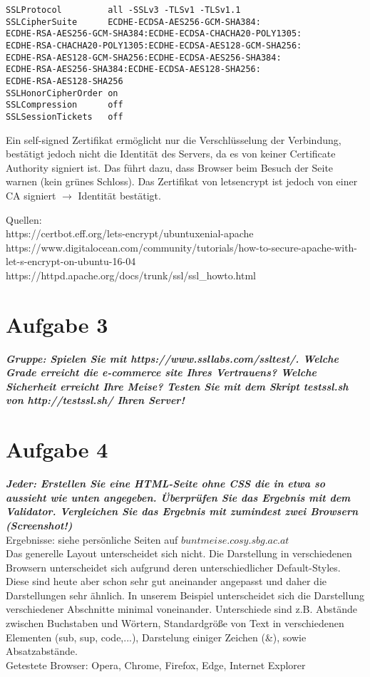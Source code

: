 \documentclass[12pt, a4paper]{report}
\begin{document}
\begin{enumerate}
	\begin{verbatim}
SSLProtocol         all -SSLv3 -TLSv1 -TLSv1.1
SSLCipherSuite      ECDHE-ECDSA-AES256-GCM-SHA384:
ECDHE-RSA-AES256-GCM-SHA384:ECDHE-ECDSA-CHACHA20-POLY1305:
ECDHE-RSA-CHACHA20-POLY1305:ECDHE-ECDSA-AES128-GCM-SHA256:
ECDHE-RSA-AES128-GCM-SHA256:ECDHE-ECDSA-AES256-SHA384:
ECDHE-RSA-AES256-SHA384:ECDHE-ECDSA-AES128-SHA256:
ECDHE-RSA-AES128-SHA256
SSLHonorCipherOrder on
SSLCompression      off
SSLSessionTickets   off
	\end{verbatim}
Ein self-signed Zertifikat ermöglicht nur die Verschlüsselung der Verbindung, bestätigt jedoch nicht die Identität des Servers, da es von keiner Certificate Authority signiert ist. Das führt dazu, dass Browser beim Besuch der Seite warnen (kein grünes Schloss). Das Zertifikat von letsencrypt ist jedoch von einer CA signiert $\rightarrow$ Identität bestätigt. 
\end{enumerate}
Quellen:\\
https://certbot.eff.org/lets-encrypt/ubuntuxenial-apache\\
https://www.digitalocean.com/community/tutorials/how-to-secure-apache-with-let-s-encrypt-on-ubuntu-16-04\\
https://httpd.apache.org/docs/trunk/ssl/ssl\_howto.html


\section*{Aufgabe 3}
\textbf{\textit{Gruppe: Spielen Sie mit https://www.ssllabs.com/ssltest/. Welche Grade erreicht
die e-commerce site Ihres Vertrauens? Welche Sicherheit erreicht Ihre Meise? Testen Sie
mit dem Skript testssl.sh von http://testssl.sh/ Ihren Server!}}

\section*{Aufgabe 4}
\textbf{\textit{Jeder: Erstellen Sie eine HTML-Seite ohne CSS die in etwa so aussieht wie unten angegeben.
Überprüfen Sie das Ergebnis mit dem Validator. Vergleichen Sie das Ergebnis
mit zumindest zwei Browsern (Screenshot!)}}\\
Ergebnisse: siehe persönliche Seiten auf $buntmeise.cosy.sbg.ac.at$\\
Das generelle Layout unterscheidet sich nicht. Die Darstellung in verschiedenen Browsern unterscheidet sich aufgrund deren
unterschiedlicher Default-Styles. Diese sind heute aber schon sehr gut aneinander angepasst und daher die Darstellungen sehr ähnlich. In unserem Beispiel unterscheidet sich die Darstellung verschiedener Abschnitte minimal voneinander. Unterschiede sind z.B. Abstände zwischen Buchstaben und Wörtern, Standardgröße von Text in verschiedenen Elementen (sub, sup, code,...), Darstelung einiger Zeichen (\&), sowie Absatzabstände.\\
Getestete Browser: Opera, Chrome, Firefox, Edge, Internet Explorer
\end{document}
